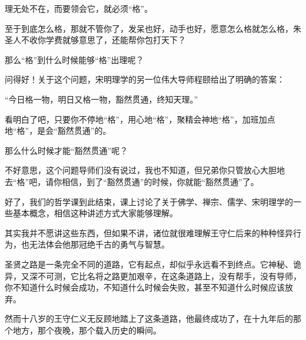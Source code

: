 \begin{multicols}{\theparacolNo}
		理无处不在，而要领会它，就必须“格”。

		至于到底怎么格，那就不管你了，发呆也好，动手也好，愿意怎么格就怎么格，朱圣人不收你学费就够意思了，还能帮你包打天下？

		那么“格”到什么时候能够“格”出理呢？

		问得好！关于这个问题，宋明理学的另一位伟大导师程颐给出了明确的答案：

		“今日格一物，明日又格一物，豁然贯通，终知天理。”

		看明白了吧，只要你不停地“格”，用心地“格”，聚精会神地“格”，加班加点地“格”，是会“豁然贯通”的。

		那么什么时候才能“豁然贯通”呢？

		不好意思，这个问题导师们没有说过，我也不知道，但兄弟你只管放心大胆地去“格”吧，请你相信，到了“豁然贯通”的时候，你就能“豁然贯通”了。

		好了，我们的哲学课到此结束，课上讨论了关于佛学、禅宗、儒学、宋明理学的一些基本概念，相信这种讲述方式大家能够理解。

		其实我并不愿讲这些东西，但如果不讲，诸位就很难理解王守仁后来的种种怪异行为，也无法体会他那冠绝千古的勇气与智慧。

		圣贤之路是一条完全不同的道路，它有起点，却似乎永远看不到终点。它神秘、诡异，又深不可测，它比名将之路更加艰辛，在这条道路上，没有帮手，没有导师，你不知道什么时候会成功，不知道什么时候会失败，甚至不知道什么时候应该放弃。

		然而十八岁的王守仁义无反顾地踏上了这条道路，他最终成功了，在十九年后的那个地方，那个夜晚，那个载入历史的瞬间。
		\ifnum{}
	\end{multicols}
\fi
\newpage
